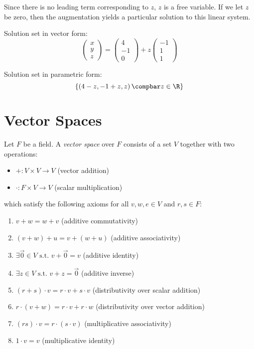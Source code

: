 \documentclass[12pt]{article}
\begin{document}
\begin{exmp}
    Since there is no leading term corresponding to $z$, $z$ is a free variable. If we let $z$ be zero, then the augmentation yields a particular solution to this linear system.

    Solution set in vector form:
    \[\begin{pmatrix}
            x \\ y \\ z
        \end{pmatrix} = \begin{pmatrix}
            4 \\ -1 \\ 0
        \end{pmatrix} + z\begin{pmatrix}
            -1 \\ 1 \\ 1
        \end{pmatrix}\]

    Solution set in parametric form:
    \[\left\{\left(4 - z, -1 + z, z\right) \compbar z \in \R \right\}\]

\end{exmp}

\section{Vector Spaces}

\begin{defn}
    Let $F$ be a field. A \emph{vector space} over $F$ consists of a set $V$ together with two operations:

    \begin{itemize}
        \item[] $+: V \times V \to V$ (vector addition)
        \item[] $\cdot: F \times V \to V$ (scalar multiplication)
    \end{itemize}
    which satisfy the following axioms for all $v, w, e \in V$ and $r, s \in F$:
    \begin{enumerate}
        \item $v + w = w + v$ (additive commutativity)
        \item $(v + w) + u = v + (w + u)$ (additive associativity)
        \item $\exists \vec{0} \in V \textrm{ s.t. } v + \vec{0} = v$ (additive identity)
        \item $\exists z \in V \textrm{ s.t. } v + z = \vec{0}$ (additive inverse)
        \item $(r + s) \cdot v = r \cdot v + s \cdot v$ (distributivity over scalar addition)
        \item $r \cdot (v + w) = r \cdot v + r \cdot w$ (distributivity over vector addition)
        \item $(rs)\cdot v = r \cdot (s \cdot v)$ (multiplicative associativity)
        \item $1 \cdot v = v$ (multiplicative identity)
    \end{enumerate}
\end{defn}
\end{document}
